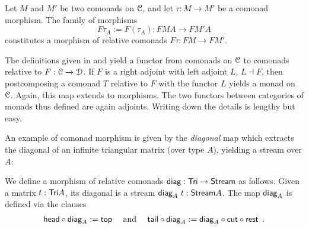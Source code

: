\documentclass[a4paper,USenglish]{lipics}
\begin{document}
\begin{Long}

\begin{ex}\label{ex_relcom_from_com_morphism}
 Let $M$ and $M'$ be two comonads on ${\mathcal{C}}$, and let $\tau : M \to M'$ be a comonad morphism. 
 The family of morphisms \[F\tau_A := F(\tau_A) : FMA \to FM'A\] constitutes a morphism of 
 relative comonads $F\tau : FM\to FM'$.
\end{ex}


\begin{rem}
 The definitions given in  and  yield a functor from 
 comonads on ${\mathcal{C}}$ to comonads relative to $F:{\mathcal{C}}\to\mathcal{D}$. 
 If $F$ is a right adjoint with left adjoint $L$, $L\dashv F$, then postcomposing a comonad $T$ relative to $F$ with the functor $L$
 yields a monad on ${\mathcal{C}}$. Again, this map extends to morphisms.
 The two functors between categories of monads thus defined are again adjoints.
 Writing down the details is lengthy but easy.
 
\end{rem}

\end{Long}


An example of comonad morphism is given by the \emph{diagonal} map which extracts the diagonal of an infinite triangular matrix (over type $A$),
yielding a stream over $A$:

\begin{ex}\label{ex_diag}
We define a morphism of relative comonads $\mathsf{diag} : \mathsf{Tri} \to \mathsf{Stream}$ as follows.
Given a matrix $t : \mathsf{Tri} A$, its diagonal is a stream $\mathsf{diag}_A~t : \mathsf{Stream} A$.
The map $\mathsf{diag}_A$ is defined via the clauses
\begin{align*} \comp{\diagonal_A}{\shead} := \head \quad\text{ and } \quad %
                  \comp{\diagonal_A}{\stail} := \comp{\comp{\tail}{\cut}}{\diagonal_A} \enspace . %
    \end{align*}
\end{ex}
\end{document}
